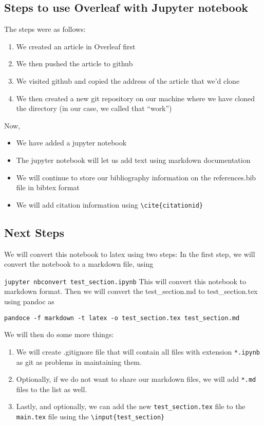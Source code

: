 \subsection*{Steps to use Overleaf with Jupyter
notebook}\label{steps-to-use-overleaf-with-jupyter-notebook}

The steps were as follows:

\begin{enumerate}
\def\labelenumi{\arabic{enumi}.}
\item
  We created an article in Overleaf first
\item
  We then pushed the article to github
\item
  We visited github and copied the address of the article that we'd
  clone
\item
  We then created a new git repository on our machine where we have
  cloned the directory (in our case, we called that ``work'')
\end{enumerate}

Now,

\begin{itemize}
\item
  We have added a jupyter notebook
\item
  The jupyter notebook will let us add text using markdown documentation
\item
  We will continue to store our bibliography information on the
  references.bib file in bibtex format
\item
  We will add citation information using
  \texttt{\textbackslash{}cite\{citationid\}}
\end{itemize}

\subsection*{Next Steps}\label{next-steps}

We will convert this notebook to latex using two steps: In the first
step, we will convert the notebook to a markdown file, using

\texttt{jupyter\ nbconvert\ test\_section.ipynb} This will convert this
notebook to markdown format. Then we will convert the test\_section.md
to test\_section.tex using pandoc as

\texttt{pandoce\ -f\ markdown\ -t\ latex\ -o\ test\_section.tex\ test\_section.md}

We will then do some more things:

\begin{enumerate}
\def\labelenumi{\arabic{enumi}.}
\item
  We will create .gitignore file that will contain all files with
  extension \texttt{*.ipynb} as git as problems in maintaining them.
\item
  Optionally, if we do not want to share our markdown files, we will add
  \texttt{*.md} files to the list as well.
\item
  Lastly, and optionally, we can add the new \texttt{test\_section.tex}
  file to the \texttt{main.tex} file using the
  \texttt{\textbackslash{}input\{test\_section\}}
\end{enumerate}

